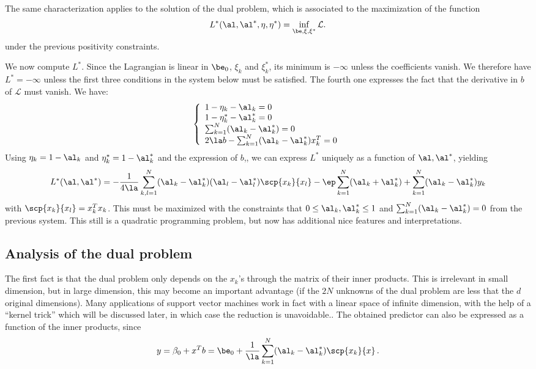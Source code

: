 The same characterization applies to the solution of the dual problem,
which  is associated to the maximization of the function 
$$
L^*(\al, \al^*, \eta, \eta^*) = \inf_{\be, \xi, \xi^*} \mathcal L.
$$
 under the previous
positivity constraints. 

We now compute $L^*$. Since the Lagrangian is linear in $\be_0$,
$\xi_k$ and $\xi_k^*$, its minimum is $-\infty$ unless the
coefficients vanish. We therefore have $L^* = -\infty$ unless the first three conditions in the system below must be satisfied. The fourth one expresses the fact that the derivative in $b$ of $\mathcal L$ must vanish. We have:
$$
\left\{\begin{array}{l}
1 - \eta_k - \al_k = 0 \\
1 - \eta_k^* - \al_k^* = 0 \\
\sum_{k=1}^N (\al_k-\al_k^*) = 0 \\
2 \la b - \sum_{k=1}^N (\al_k-\al_k^*) x_k^T = 0
       \end{array}
\right.
$$ 
Using $\eta_k  = 1- \al_k$ and $\eta_k^* = 1- \al_k^*$ and the
expression of $b$,, we can 
express $L^*$ uniquely as a function of $\al, \al^*$, yielding
$$
L^*(\al, \al^*) = -\frac{1}{4\la} \sum_{k,l=1}^N
(\al_k-\al_k^*)(\al_l-\al_l^*)\scp{x_k}{x_l} - \ep \sum_{k=1}^N
(\al_k+\al_k^*) + \sum_{k=1}^N (\al_k-\al_k^*)y_k
$$
with $\scp{x_k}{x_l} = x_k^Tx_k$.
This must be maximized with the constraints that $0\leq \al_k,
\al_k^*\leq 1$ and $\sum_{k=1}^N (\al_k-\al_k^*) = 0$ 
from the previous system. This still is
a quadratic programming problem, but now has additional nice features
and interpretations.

\subsection{Analysis of the dual problem}
The first fact is that the dual problem only depends on the $x_k$'s
through the matrix of their inner products. This is irrelevant in 
small dimension, but in large dimension, this may become an important
advantage (if the $2N$ unknowns of the dual problem are less that the $d$ original dimensions). Many applications of support vector machines work in fact
with a linear space of infinite dimension, with the help of a 
``kernel trick'' which will be discussed later, in which case the reduction is unavoidable.. The obtained predictor can
also be expressed as a function of the inner products, since
$$
y = \beta_0 + x^T b = \be_0 + \frac{1}{\la} \sum_{k=1}^N (\al_k-\al_k^*)
\scp{x_k}{x}\,.
$$

